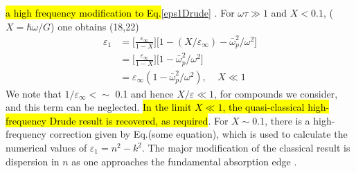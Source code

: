 \hl{a high frequency modification to Eq.}\eqref{eps1Drude} . 
For $\omega \tau \gg 1$ and $X < 0.1$, ($X = \hbar \omega/G$) one obtains (18,22)
\begin{align}
   \varepsilon_1 &= \Bigg[ \frac{\varepsilon_{\infty}}{1 - X} \Bigg]\big[ 1 - (X/\varepsilon_{\infty}) - \bar\omega_p^2/\omega^2 \big] \\
                &= \Bigg[ \frac{\varepsilon_{\infty}}{1 - X} \Bigg]\big[ 1 - \bar\omega_p^2/\omega^2 \big] \\
                &= \varepsilon_{\infty}(1 - \bar\omega_p^2/\omega^2), \:\:\:\:\: X \ll 1
\end{align}
We note that $1/\varepsilon_{\infty} <\sim$ 0.1 and hence $X/\varepsilon \ll 1$, for compounds we 
consider, and this term can be neglected. \hl{In the limit $X \ll 1$, the quasi-classical high-frequency
Drude result is recovered, as required}. For $X \sim 0.1$, there is a high-frequency correction given by
Eq.(some equation), which is used to calculate the numerical values of $\varepsilon_1 = n^2 - k^2$.
The major modification of the classical result is dispersion in $n$ as one approaches the fundamental
absorption edge \cite{Jensen1983}.


